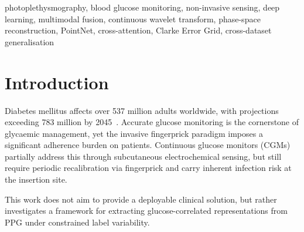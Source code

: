 \documentclass[conference]{IEEEtran}
\begin{document}
\begin{abstract}
demonstrating that multimodal cross-attention is most beneficial under
realistic wearable-sensor noise conditions.
A signal-quality-index filter and t-SNE identity ablation further verify
data integrity and rule out patient-identity memorisation.
A preliminary cross-dataset generalisation study on the PhysioNet BIG~IDEAs
Glycemic Variability dataset (Empatica~E4 BVP, 64~Hz, Subject~001) confirms
device-agnostic representation learning: zero-shot MAE~=~15.20~mg/dL improves
to 13.99~mg/dL by fine-tuning only the cross-attention and regression head
(312,321 of 548,801 parameters, 57\%), leaving the branch encoders fully frozen.
While the dataset exhibits limited intra-subject glucose variability,
the results demonstrate strong cross-subject estimation capability across the
four held-out patients.
All results are obtained from a single trained checkpoint with
548,801 parameters and are independently verifiable against the training log
and saved checkpoint.
\end{abstract}

\begin{IEEEkeywords}
photoplethysmography, blood glucose monitoring, non-invasive sensing, deep
learning, multimodal fusion, continuous wavelet transform, phase-space
reconstruction, PointNet, cross-attention, Clarke Error Grid,
cross-dataset generalisation
\end{IEEEkeywords}

\section{Introduction}
\label{sec:intro}

Diabetes mellitus affects over 537 million adults worldwide, with projections
exceeding 783 million by 2045~\cite{idf2021}.  Accurate glucose monitoring is
the cornerstone of glycaemic management, yet the invasive fingerprick paradigm
imposes a significant adherence burden on patients.  Continuous glucose monitors
(CGMs) partially address this through subcutaneous electrochemical sensing, but
still require periodic recalibration via fingerprick and carry inherent infection
risk at the insertion site.

This work does not aim to provide a deployable clinical solution, but rather
investigates a framework for extracting glucose-correlated representations
from PPG under constrained label variability.
\end{document}
